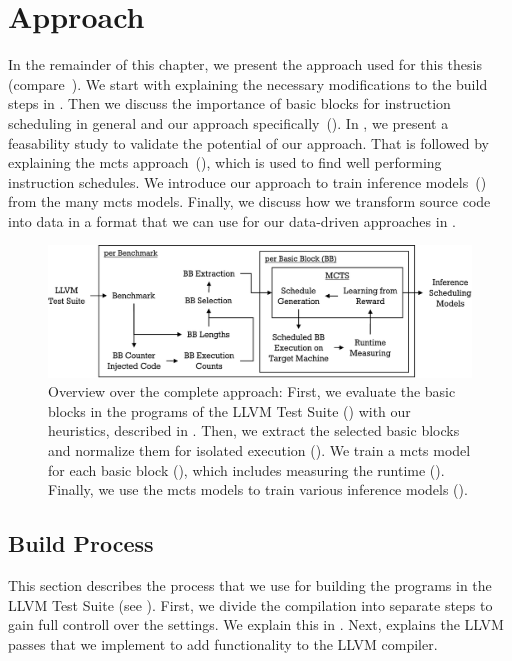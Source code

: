 \chapter{Approach}
\label{sec:approach}

In the remainder of this chapter, we present the approach used for this thesis (compare~).
We start with explaining the necessary modifications to the build steps in .
Then we discuss the importance of basic blocks for instruction scheduling in general and our approach specifically~().
In , we present a feasability study to validate the potential of our approach.
That is followed by explaining the \ac{mcts} approach~(), which is used to find well performing instruction schedules.
We introduce our approach to train inference models~() from the many \ac{mcts} models.
Finally, we discuss how we transform source code into data in a format that we can use for our data-driven approaches in .
\begin{figure}
    \centering
    \includegraphics[width=\textwidth]{img/ppt/approach_overview-crop.pdf}
    \caption[Overview Over the Approach]{Overview over the complete approach:
    First, we evaluate the basic blocks in the programs of the LLVM Test Suite () with our heuristics, described in .
    Then, we extract the selected basic blocks and normalize them for isolated execution ().
    We train a \ac{mcts} model for each basic block (), which includes measuring the runtime ().
    Finally, we use the \ac{mcts} models to train various inference models ().
    }
    \label{fig:approach:overview}
\end{figure}

\section{Build Process}
\label{sec:approach:build_process}
This section describes the process that we use for building the programs in the LLVM Test Suite (see ).
First, we divide the compilation into separate steps to gain full controll over the settings.
We explain this in .
Next,  explains the LLVM passes that we implement to add functionality to the LLVM compiler.

